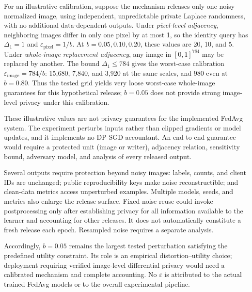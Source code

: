 For an illustrative calibration, suppose the mechanism releases only one noisy normalized image, using independent, unpredictable private Laplace randomness, with no additional data-dependent outputs. Under \emph{pixel-level adjacency}, neighboring images differ in only one pixel by at most 1, so the identity query has $\Delta_1=1$ and $\varepsilon_{\mathrm{pixel}}=1/b$. At $b=0.05,0.10,0.20$, these values are 20, 10, and 5. Under \emph{whole-image replacement adjacency}, any image in $[0,1]^{784}$ may be replaced by another. The bound $\Delta_1\le784$ gives the worst-case calibration $\varepsilon_{\mathrm{image}}=784/b$: 15,680, 7,840, and 3,920 at the same scales, and 980 even at $b=0.80$. Thus the tested grid yields very loose worst-case whole-image guarantees for this hypothetical release; $b=0.05$ does not provide strong image-level privacy under this calibration.

These illustrative values are not privacy guarantees for the implemented FedAvg system. The experiment perturbs inputs rather than clipped gradients or model updates, and it implements no DP-SGD accountant. An end-to-end guarantee would require a protected unit (image or writer), adjacency relation, sensitivity bound, adversary model, and analysis of every released output.

Several outputs require protection beyond noisy images: labels, counts, and client IDs are unchanged; public reproducibility keys make noise reconstructible; and clean-data metrics access unperturbed examples. Multiple models, seeds, and metrics also enlarge the release surface. Fixed-noise reuse could invoke postprocessing only after establishing privacy for all information available to the learner and accounting for other releases. It does not automatically constitute a fresh release each epoch. Resampled noise requires a separate analysis.

Accordingly, $b=0.05$ remains the largest tested perturbation satisfying the predefined utility constraint. Its role is an empirical distortion--utility choice; deployment requiring verified image-level differential privacy would need a calibrated mechanism and complete accounting. No $\varepsilon$ is attributed to the actual trained FedAvg models or to the overall experimental pipeline.


